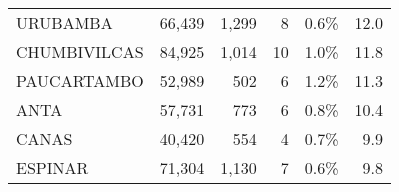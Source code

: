 \begin{tabular}{lrrrrr}
	\cellcolor[HTML]{FFFFC7}URUBAMBA      & 66,439                                                         & 1,299                                                                           & 8                                                              & 0.6\%                                                                  & 12.0                                                                                                                               \\
	\cellcolor[HTML]{FFFFC7}CHUMBIVILCAS  & 84,925                                                         & 1,014                                                                           & 10                                                             & 1.0\%                                                                  & 11.8                                                                                                                               \\
	\cellcolor[HTML]{FFFFC7}PAUCARTAMBO   & 52,989                                                         & 502                                                                             & 6                                                              & 1.2\%                                                                  & 11.3                                                                                                                               \\
	\cellcolor[HTML]{FFFFC7}ANTA          & 57,731                                                         & 773                                                                             & 6                                                              & 0.8\%                                                                  & 10.4                                                                                                                               \\
	\cellcolor[HTML]{FFFFC7}CANAS         & 40,420                                                         & 554                                                                             & 4                                                              & 0.7\%                                                                  & 9.9                                                                                                                                \\
	\cellcolor[HTML]{FFFFC7}ESPINAR       & 71,304                                                         & 1,130                                                                           & 7                                                              & 0.6\%                                                                  & 9.8                                                                                                                                \\

\end{tabular}
